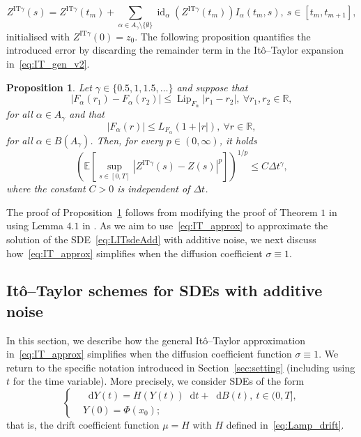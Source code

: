 \documentclass[11pt]{amsart}
\newtheorem{proposition}[theorem]{Proposition}
\newcommand{\E}{{\mathbb E}}
\newcommand*\diff{\mathop{}\!\mathrm{d}}
\newcommand{\IT}{\textrm{IT}}
\newcommand{\id}{\operatorname{id}}
\newcommand{\Lip}{\operatorname{Lip}}
\begin{document}
{\begin{equation}
Z^{\IT \gamma}(s) = Z^{\IT \gamma}(t_{m}) + \sum_{\alpha \in A_{\gamma} \setminus \{  \emptyset \}} \id_{\alpha}(Z^{\IT \gamma}(t_{m})) I_{\alpha}(t_{m},s),\ s \in [t_{m},t_{m+1}],
\end{equation}
initialised with $Z^{\IT \gamma}(0) = z_{0}$. The following proposition quantifies the introduced error by discarding the remainder term in the Itô--Taylor expansion in~\eqref{eq:IT_gen_v2}.
\begin{proposition}\label{prop:ITexpConv}
Let $\gamma \in \{0.5,1,1.5,\ldots \}$ and suppose that
\begin{equation*}
\left| F_{\alpha}(r_{1}) - F_{\alpha}(r_{2}) \right| \leq \Lip_{F_{\alpha}} \left| r_{1}-r_{2} \right|,\ \forall r_{1},r_{2} \in \mathbb{R},
\end{equation*}
for all $\alpha \in A_{\gamma}$ and that 
\begin{equation*}
\left| F_{\alpha}(r) \right| \leq L_{F_{\alpha}} \left( 1 + \left| r \right| \right),\ \forall r \in \mathbb{R},
\end{equation*}
for all $\alpha \in B(A_{\gamma})$. Then, for every $p \in (0,\infty)$, it holds
\begin{equation*}
\left( \E \left[ \sup_{s \in [0,T]} \left| Z^{\IT \gamma}(s) - Z(s) \right|^{p} \right] \right)^{1/p} \leq C \Delta t^{\gamma},
\end{equation*}
where the constant $C>0$ is independent of $\Delta t$.
\end{proposition}
The proof of Proposition~\ref{prop:ITexpConv} follows from modifying the proof of Theorem $1$ in \cite{MR1459485} using Lemma $4.1$ in \cite{MR1417823}. As we aim to use~\eqref{eq:IT_approx} to approximate the solution of the SDE~\eqref{eq:LITsdeAdd} with additive noise, we next discuss how~\eqref{eq:IT_approx} simplifies when the diffusion coefficient $\sigma \equiv 1$.

\subsection{Itô--Taylor schemes for SDEs with additive noise}\label{sec:IT_add_noise}
In this section, we describe how the general Itô--Taylor approximation in~\eqref{eq:IT_approx} simplifies when the diffusion coefficient function $\sigma \equiv 1$. We return to the specific notation introduced in Section~\ref{sec:setting} (including using $t$ for the time variable). More precisely, we consider SDEs of the form
\begin{equation}\label{eq:IT_SDE_additive}
\left\lbrace
\begin{aligned}
& \diff Y(t) = H(Y(t)) \diff t + \diff B(t),\ t \in (0,T], \\
& Y(0) = \Phi(x_{0});
\end{aligned}
\right.
\end{equation}
that is, the drift coefficient function $\mu = H$ with $H$ defined in~\eqref{eq:Lamp_drift}.

}
\end{document}

